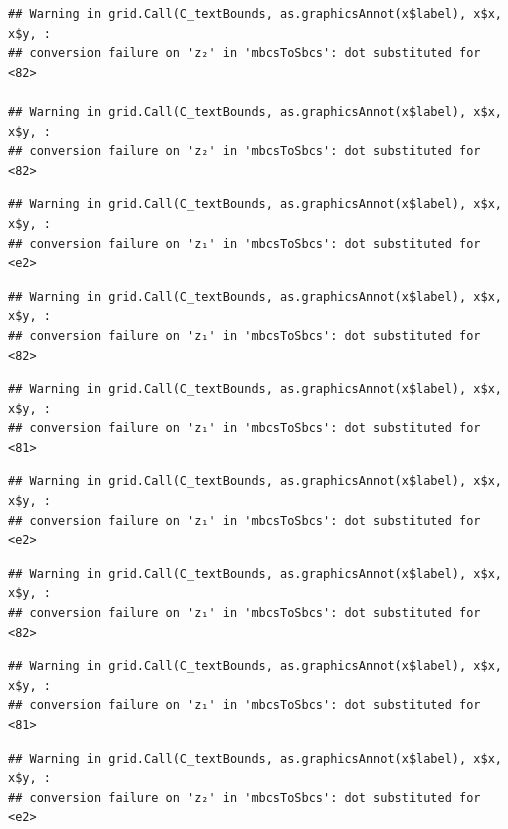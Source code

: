 \documentclass[]{article}
\begin{document}
\begin{verbatim}
## Warning in grid.Call(C_textBounds, as.graphicsAnnot(x$label), x$x, x$y, :
## conversion failure on 'z₂' in 'mbcsToSbcs': dot substituted for <82>

## Warning in grid.Call(C_textBounds, as.graphicsAnnot(x$label), x$x, x$y, :
## conversion failure on 'z₂' in 'mbcsToSbcs': dot substituted for <82>
\end{verbatim}

\begin{verbatim}
## Warning in grid.Call(C_textBounds, as.graphicsAnnot(x$label), x$x, x$y, :
## conversion failure on 'z₁' in 'mbcsToSbcs': dot substituted for <e2>
\end{verbatim}

\begin{verbatim}
## Warning in grid.Call(C_textBounds, as.graphicsAnnot(x$label), x$x, x$y, :
## conversion failure on 'z₁' in 'mbcsToSbcs': dot substituted for <82>
\end{verbatim}

\begin{verbatim}
## Warning in grid.Call(C_textBounds, as.graphicsAnnot(x$label), x$x, x$y, :
## conversion failure on 'z₁' in 'mbcsToSbcs': dot substituted for <81>
\end{verbatim}

\begin{verbatim}
## Warning in grid.Call(C_textBounds, as.graphicsAnnot(x$label), x$x, x$y, :
## conversion failure on 'z₁' in 'mbcsToSbcs': dot substituted for <e2>
\end{verbatim}

\begin{verbatim}
## Warning in grid.Call(C_textBounds, as.graphicsAnnot(x$label), x$x, x$y, :
## conversion failure on 'z₁' in 'mbcsToSbcs': dot substituted for <82>
\end{verbatim}

\begin{verbatim}
## Warning in grid.Call(C_textBounds, as.graphicsAnnot(x$label), x$x, x$y, :
## conversion failure on 'z₁' in 'mbcsToSbcs': dot substituted for <81>
\end{verbatim}

\begin{verbatim}
## Warning in grid.Call(C_textBounds, as.graphicsAnnot(x$label), x$x, x$y, :
## conversion failure on 'z₂' in 'mbcsToSbcs': dot substituted for <e2>
\end{verbatim}
\end{document}
